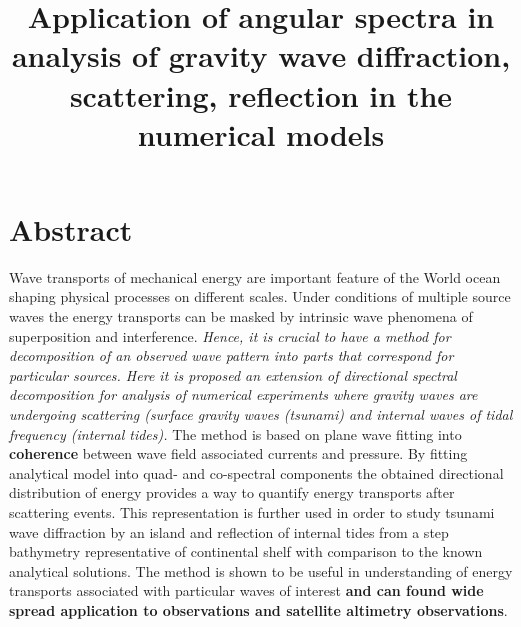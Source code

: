 



\title{Application of angular spectra in analysis of gravity wave diffraction, scattering, reflection in the numerical models}
\maketitle

\section*{Abstract}
Wave transports of mechanical energy are important feature of the World ocean shaping physical processes on different scales. Under conditions of multiple source waves the energy transports can be masked by intrinsic wave phenomena of superposition and interference. \textit{Hence, it is crucial to have a method for decomposition of an observed wave pattern into parts that correspond for particular sources. Here it is proposed an extension of directional spectral decomposition for analysis of numerical experiments where gravity waves are undergoing scattering (surface gravity waves (tsunami) and internal waves of tidal frequency (internal tides).} The method is based on plane wave fitting into \textbf{coherence} between wave field associated currents and pressure. By fitting analytical model into quad- and co-spectral components the obtained directional distribution of energy provides a way to quantify energy transports after scattering events. This representation is further used in order to study tsunami wave diffraction by an island and reflection of internal tides from a step bathymetry representative of continental shelf with comparison to the known analytical solutions. The method is shown to be useful in understanding of energy transports associated with particular waves of interest\textbf{ and can found wide spread application to observations and satellite altimetry observations}.

